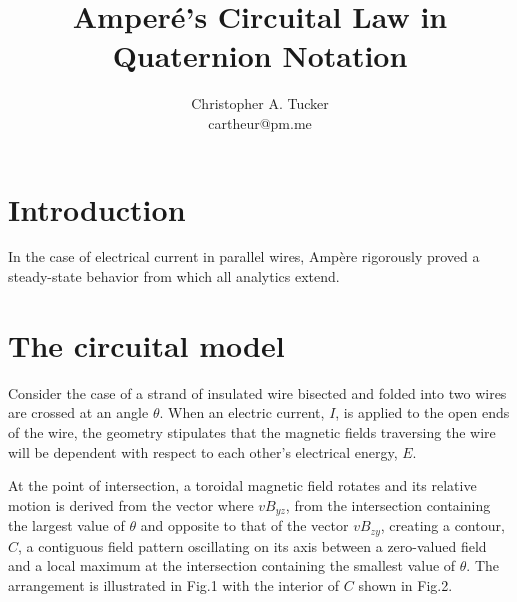 \documentclass[]{article}
\begin{document}
\title{Amper\'e's Circuital Law in Quaternion Notation}

\author{Christopher A. Tucker\\cartheur@pm.me\\}


\maketitle


\section{Introduction}
In the case of electrical current in parallel wires, Amp\`ere rigorously proved a steady-state behavior from which all analytics extend. 

\section{The circuital model}
Consider the case of a strand of insulated wire bisected and folded into two wires are crossed at an angle $\theta$. When an electric current, $I$, is applied to the open ends of the wire, the geometry stipulates that the magnetic fields traversing the wire will be dependent with respect to each other's electrical energy, $E$.

At the point of intersection, a toroidal magnetic field rotates and its relative motion is derived from the vector where $v{{B}_{yz}}$, from the intersection containing the largest value of $\theta$ and opposite to that of the vector $v{{B}_{zy}}$, creating a contour, $C$, a contiguous field pattern oscillating on its axis between a zero-valued field and a local maximum at the intersection containing the smallest value of $\theta$. The arrangement is illustrated in Fig.1 with the interior of $C$ shown in Fig.2.
\end{document}
